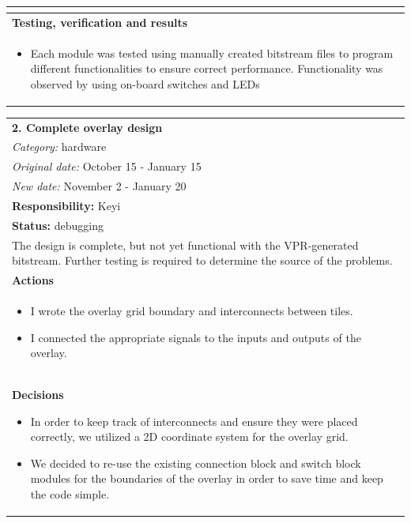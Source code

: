 \documentclass[12pt,letterpaper]{article}
\begin{document}
\begin{tabular}{|p{6.4in}|}
\begin{itemize}
\end{itemize}
\vspace{-1em} \\
\hline
\textbf{Testing, verification and results} \\
\vspace{-1em}
\begin{itemize}
\item Each module was tested using manually created bitstream files to program different functionalities to ensure correct performance.
Functionality was observed by using on-board switches and LEDs
\end{itemize} 
\vspace{-1em} \\
\hline
\end{tabular}

\begin{tabular}{|p{6.4in}|}
\hline
\textbf{2. Complete overlay design} \\
\emph{Category:} hardware \\
\emph{Original date:} October 15 - January 15 \\
\emph{New date:} November 2 - January 20 \\
\hline
\textbf{Responsibility:} Keyi \\
\hline
\textbf{Status:} debugging \\
The design is complete, but not yet functional with the VPR-generated bitstream.
Further testing is required to determine the source of the problems. \\
\hline
\textbf{Actions} \\
\vspace{-1em}
\begin{itemize}
\item I wrote the overlay grid boundary and interconnects between tiles.
\item I connected the appropriate signals to the inputs and outputs of the overlay.
\end{itemize} 
\vspace{-1em} \\
\hline
\textbf{Decisions}
\begin{itemize}
\item In order to keep track of interconnects and ensure they were placed correctly, we utilized a 2D coordinate system for the overlay grid.
\item We decided to re-use the existing connection block and switch block modules for the boundaries of the overlay in order to save time and keep the code simple.

\end{itemize}
\end{tabular}
\end{document}
